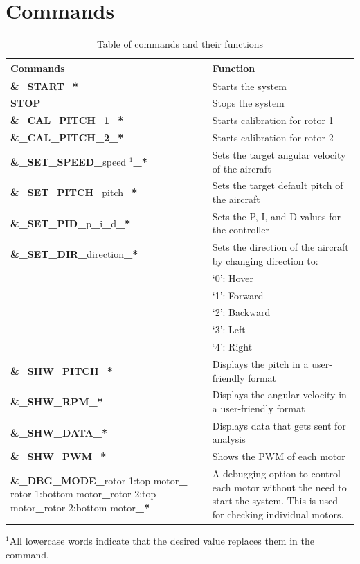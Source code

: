     \section{Commands}
    \vspace*{-5mm}
    \begin{table}[H]
        \centering
        \small
        \caption{Table of commands and their functions}
        \label{tab: cmd_table}
        \begin{tabularx}{\textwidth}{|X|X|}
        \hline
        \textbf{Commands} & \textbf{Function} \\ \hline
        \textbf{\&\_START\_*} & Starts the system \\ \hline
        \textbf{STOP} & Stops the system \\ \hline
        \textbf{\&\_CAL\_PITCH\_1\_*} & Starts calibration for rotor 1 \\ \hline
        \textbf{\&\_CAL\_PITCH\_2\_*} & Starts calibration for rotor 2 \\ \hline
        \textbf{\&\_SET\_SPEED\_}speed \(^1\)\textbf{\_*}& Sets the target angular velocity of the aircraft \\ \hline
        \textbf{\&\_SET\_PITCH\_}pitch\textbf{\_*} & Sets the target default pitch of the aircraft \\ \hline
        \textbf{\&\_SET\_PID\_}p\textbf{\_}i\textbf{\_}d\textbf{\_*} & Sets the P, I, and D values for the controller \\ \hline
        \textbf{\&\_SET\_DIR\_}direction\textbf{\_*} & Sets the direction of the aircraft by changing direction to: \\ 
        & `0': Hover \\
        & `1': Forward \\
        & `2': Backward \\
        & `3': Left \\
        & `4': Right \\ \hline
        \textbf{\&\_SHW\_PITCH\_*} & Displays the pitch in a user-friendly format \\ \hline
        \textbf{\&\_SHW\_RPM\_*} & Displays the angular velocity in a user-friendly format \\ \hline
        \textbf{\&\_SHW\_DATA\_*} & Displays data that gets sent for analysis \\ \hline
        \textbf{\&\_SHW\_PWM\_*} & Shows the PWM of each motor \\ \hline
        \textbf{\&\_DBG\_MODE\_}rotor 1:top motor\textbf{\_ }rotor 1:bottom motor\textbf{\_}rotor 2:top motor\textbf{\_}rotor 2:bottom motor\textbf{\_*} 
        & A debugging option to control each motor without the need to start the system. This is used for checking individual motors. \\ \hline
    \end{tabularx}
    \(^1\)\small All lowercase words indicate that the desired value replaces them in the command.
    \end{table}

